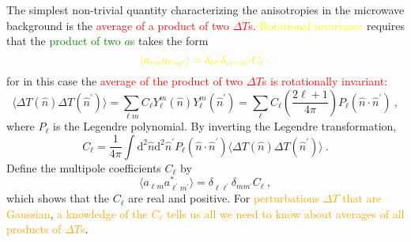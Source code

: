 \documentclass[12pt,a4paper]{article}
\newcommand{\dif}{\mathrm{d}}
\begin{document}
The simplest non-trivial quantity characterizing the anisotropies in the microwave background is the \textcolor{red}{average of a product of two $\Delta T$s}. \textcolor{yellow}{Rotational invariance} requires that the \textcolor{green}{product of two $a$s} takes the form
\begin{equation}
\color{yellow} \langle a_{\ell m} a_{\ell^\prime m^\prime} \rangle = \delta_{\ell \ell^\prime} \delta_{m -m^\prime} C_\ell ~,
\end{equation}
for in this case the \textcolor{red}{average of the product of two $\Delta T$s is rotationally invariant}:
\begin{equation}
\langle \Delta T(\hat{n})\Delta T(\hat{n}^\prime) \rangle = \sum_{\ell m} C_\ell Y_\ell^m(\hat{n}) Y_\ell^m(\hat{n}^\prime) = \sum_\ell C_\ell \left(\dfrac{2\ell +1}{4\pi} \right) P_\ell(\hat{n} \cdot \hat{n}^\prime) ~,
\end{equation}
where $P_\ell$ is the Legendre polynomial. By inverting the Legendre transformation, 
\begin{equation}
C_\ell = \dfrac{1}{4\pi} \int \dif^2 \hat{n} \dif^2 \hat{n}^\prime P_\ell(\hat{n} \cdot \hat{n}^\prime)  \langle \Delta T(\hat{n})\Delta T(\hat{n}^\prime) \rangle ~.
\end{equation}
Define the multipole coefficients $C_\ell$ by
\begin{equation}
\langle a_{\ell m} a_{\ell^\prime m^\prime}^\ast \rangle = \delta_{\ell \ell^\prime} \delta_{m m^\prime} C_\ell ~,
\end{equation}
which shows that the $C_\ell$ are real and positive. For \textcolor{orange}{perturbations $\Delta T$ that are Gaussian}, \textcolor{orange}{a knowledge of the $C_\ell$ tells us all we need to know about averages of all products of $\Delta T$s}.
\end{document}
